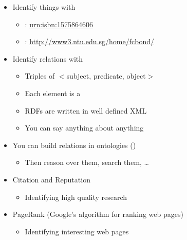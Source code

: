 \documentclass[a4paper,landscape,headrule,footrule,xetex]{foils}
\begin{document}
\begin{itemize}
\item Identify things with  
  \begin{itemize}
  \item {}: \url{urn:isbn:1575864606}
  \item {}: \url{http://www3.ntu.edu.sg/home/fcbond/}
  \end{itemize}
\item Identify relations with  
  \begin{itemize}
  \item Triples of $<$subject, predicate, object$>$
  \item Each element is a 
  \item RDFs are written in well defined XML
  \item You can say anything about anything
  \end{itemize}
\item You can build relations in ontologies ()
  \begin{itemize}
  \item Then reason over them, search them, \ldots
  \end{itemize}
\end{itemize}



\begin{itemize}
\item Citation and Reputation
  \begin{itemize}
  \item Identifying high quality research
  \end{itemize}
\item PageRank (Google's algorithm for ranking web pages)
  \begin{itemize}
  \item Identifying interesting web pages
  \end{itemize}
\end{itemize}

\end{document}
